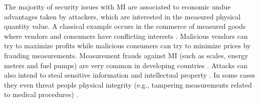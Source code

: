 \documentclass[journal]{IEEEtran}
\begin{document}
The majority of security issues with MI are associated to economic undue advantages taken by attackers, which are interested in the measured physical quantity value. A classical example occurs in the commerce of measured goods where vendors and consumers have conflicting interests \cite{RodriguesFilho2015}. Malicious vendors can try to maximize profits while malicious consumers can try to minimize prices by frauding measurements. Measurement frauds against MI (such as scales, energy meters and fuel pumps) are very common in developing countries \cite{Camara2012,Luchsinger2008}. Attacks can also intend to steal sensitive information and intellectual property \cite{Camara2012,Oppermann2016}. In some cases they even threat people physical integrity (e.g., tampering measurements related to medical procedures) \cite{Boccardo2014}.
\end{document}
